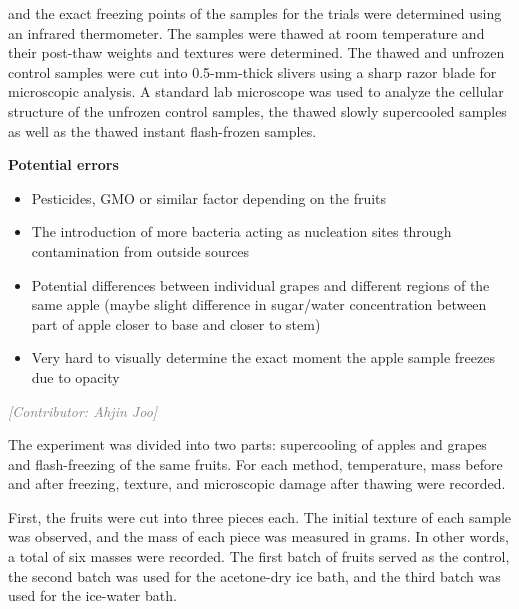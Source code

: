 \documentclass[12pt, a4paper]{article}
\newcommand{\contributor}[1]{\vspace{4pt}\noindent\textcolor{gray}{\small\textit{[Contributor: #1]}}\vspace{2pt}}
\begin{document}

and the exact freezing points of the samples for the trials were
determined using an infrared thermometer. The samples were thawed at
room temperature and their post-thaw weights and textures were
determined. The thawed and unfrozen control samples were cut into
0.5-mm-thick slivers using a sharp razor blade for microscopic
analysis. A standard lab microscope was used to analyze the cellular
structure of the unfrozen control samples, the thawed slowly supercooled
samples as well as the thawed instant flash-frozen samples.


\textbf{Potential errors}

\begin{itemize}
\item Pesticides, GMO or similar factor depending on the fruits
\item The introduction of more bacteria acting as nucleation sites through contamination from outside sources
\item Potential differences between individual grapes and different regions of the same apple (maybe slight difference in sugar/water concentration between part of apple closer to base and closer to stem)
\item Very hard to visually determine the exact moment the apple sample freezes due to opacity
\end{itemize}

\contributor{Ahjin Joo}

The experiment was divided into two parts: supercooling of apples and
grapes and flash-freezing of the same fruits. For each method,
temperature, mass before and after freezing, texture, and microscopic
damage after thawing were recorded.

First, the fruits were cut into three pieces each. The initial texture
of each sample was observed, and the mass of each piece was measured in
grams. In other words, a total of six masses were recorded. The first
batch of fruits served as the control, the second batch was used for the
acetone-dry ice bath, and the third batch was used for the ice-water
bath.
\end{document}
